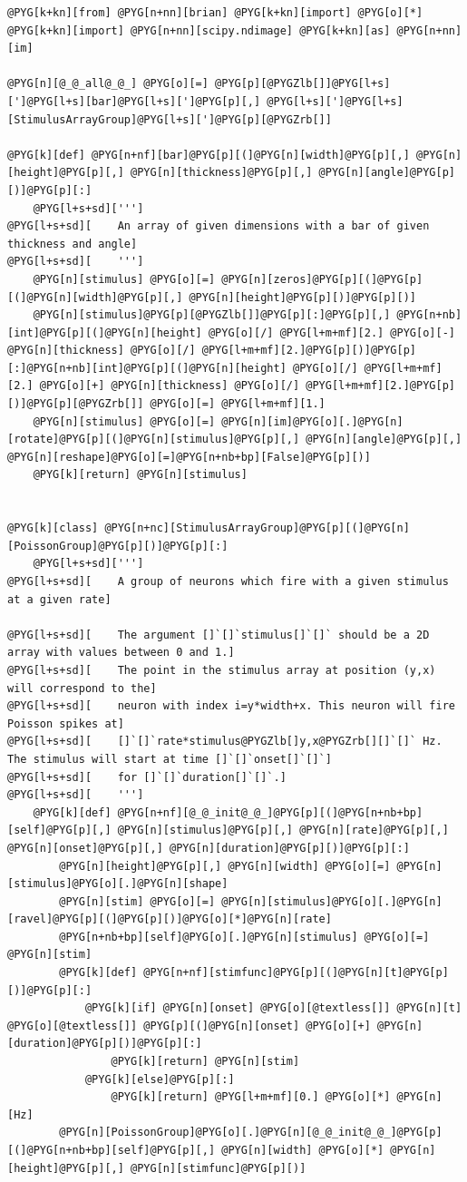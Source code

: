 \documentclass[letterpaper,10pt,english]{manual}
\begin{document}
\begin{Verbatim}[commandchars=@\[\]]
@PYG[k+kn][from] @PYG[n+nn][brian] @PYG[k+kn][import] @PYG[o][*]
@PYG[k+kn][import] @PYG[n+nn][scipy.ndimage] @PYG[k+kn][as] @PYG[n+nn][im]

@PYG[n][@_@_all@_@_] @PYG[o][=] @PYG[p][@PYGZlb[]]@PYG[l+s][']@PYG[l+s][bar]@PYG[l+s][']@PYG[p][,] @PYG[l+s][']@PYG[l+s][StimulusArrayGroup]@PYG[l+s][']@PYG[p][@PYGZrb[]]

@PYG[k][def] @PYG[n+nf][bar]@PYG[p][(]@PYG[n][width]@PYG[p][,] @PYG[n][height]@PYG[p][,] @PYG[n][thickness]@PYG[p][,] @PYG[n][angle]@PYG[p][)]@PYG[p][:]
    @PYG[l+s+sd][''']
@PYG[l+s+sd][    An array of given dimensions with a bar of given thickness and angle]
@PYG[l+s+sd][    ''']
    @PYG[n][stimulus] @PYG[o][=] @PYG[n][zeros]@PYG[p][(]@PYG[p][(]@PYG[n][width]@PYG[p][,] @PYG[n][height]@PYG[p][)]@PYG[p][)]
    @PYG[n][stimulus]@PYG[p][@PYGZlb[]]@PYG[p][:]@PYG[p][,] @PYG[n+nb][int]@PYG[p][(]@PYG[n][height] @PYG[o][/] @PYG[l+m+mf][2.] @PYG[o][-] @PYG[n][thickness] @PYG[o][/] @PYG[l+m+mf][2.]@PYG[p][)]@PYG[p][:]@PYG[n+nb][int]@PYG[p][(]@PYG[n][height] @PYG[o][/] @PYG[l+m+mf][2.] @PYG[o][+] @PYG[n][thickness] @PYG[o][/] @PYG[l+m+mf][2.]@PYG[p][)]@PYG[p][@PYGZrb[]] @PYG[o][=] @PYG[l+m+mf][1.]
    @PYG[n][stimulus] @PYG[o][=] @PYG[n][im]@PYG[o][.]@PYG[n][rotate]@PYG[p][(]@PYG[n][stimulus]@PYG[p][,] @PYG[n][angle]@PYG[p][,] @PYG[n][reshape]@PYG[o][=]@PYG[n+nb+bp][False]@PYG[p][)]
    @PYG[k][return] @PYG[n][stimulus]


@PYG[k][class] @PYG[n+nc][StimulusArrayGroup]@PYG[p][(]@PYG[n][PoissonGroup]@PYG[p][)]@PYG[p][:]
    @PYG[l+s+sd][''']
@PYG[l+s+sd][    A group of neurons which fire with a given stimulus at a given rate]

@PYG[l+s+sd][    The argument []`[]`stimulus[]`[]` should be a 2D array with values between 0 and 1.]
@PYG[l+s+sd][    The point in the stimulus array at position (y,x) will correspond to the]
@PYG[l+s+sd][    neuron with index i=y*width+x. This neuron will fire Poisson spikes at]
@PYG[l+s+sd][    []`[]`rate*stimulus@PYGZlb[]y,x@PYGZrb[][]`[]` Hz. The stimulus will start at time []`[]`onset[]`[]`]
@PYG[l+s+sd][    for []`[]`duration[]`[]`.]
@PYG[l+s+sd][    ''']
    @PYG[k][def] @PYG[n+nf][@_@_init@_@_]@PYG[p][(]@PYG[n+nb+bp][self]@PYG[p][,] @PYG[n][stimulus]@PYG[p][,] @PYG[n][rate]@PYG[p][,] @PYG[n][onset]@PYG[p][,] @PYG[n][duration]@PYG[p][)]@PYG[p][:]
        @PYG[n][height]@PYG[p][,] @PYG[n][width] @PYG[o][=] @PYG[n][stimulus]@PYG[o][.]@PYG[n][shape]
        @PYG[n][stim] @PYG[o][=] @PYG[n][stimulus]@PYG[o][.]@PYG[n][ravel]@PYG[p][(]@PYG[p][)]@PYG[o][*]@PYG[n][rate]
        @PYG[n+nb+bp][self]@PYG[o][.]@PYG[n][stimulus] @PYG[o][=] @PYG[n][stim]
        @PYG[k][def] @PYG[n+nf][stimfunc]@PYG[p][(]@PYG[n][t]@PYG[p][)]@PYG[p][:]
            @PYG[k][if] @PYG[n][onset] @PYG[o][@textless[]] @PYG[n][t] @PYG[o][@textless[]] @PYG[p][(]@PYG[n][onset] @PYG[o][+] @PYG[n][duration]@PYG[p][)]@PYG[p][:]
                @PYG[k][return] @PYG[n][stim]
            @PYG[k][else]@PYG[p][:]
                @PYG[k][return] @PYG[l+m+mf][0.] @PYG[o][*] @PYG[n][Hz]
        @PYG[n][PoissonGroup]@PYG[o][.]@PYG[n][@_@_init@_@_]@PYG[p][(]@PYG[n+nb+bp][self]@PYG[p][,] @PYG[n][width] @PYG[o][*] @PYG[n][height]@PYG[p][,] @PYG[n][stimfunc]@PYG[p][)]


\end{Verbatim}
\end{document}
